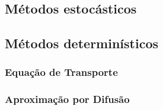 \subsection{Métodos estocásticos}
\label{subsec:mc}

\subsection{Métodos determinísticos}
\label{subsec:det}

\subsubsection{Equação de Transporte}
\label{ssubsec:transp}

\subsubsection{Aproximação por Difusão}
\label{ssubsec:difusao}

